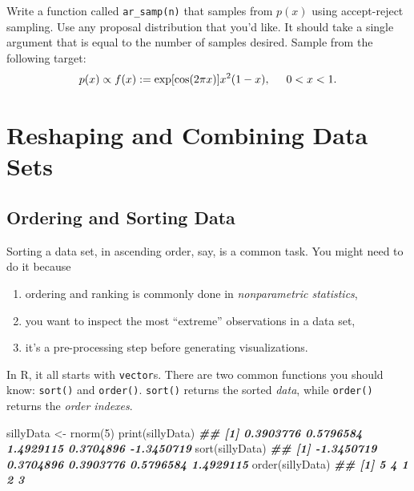 \documentclass[
  12pt,
  krantz2]{krantz}
\makeatletter
\newenvironment{Shaded}{\begin{snugshade}}{\end{snugshade}}
\newcommand{\DecValTok}[1]{\textcolor[rgb]{0.06,0.06,0.06}{#1}}
\newcommand{\DocumentationTok}[1]{\textcolor[rgb]{0.37,0.37,0.37}{\textbf{\textit{#1}}}}
\newcommand{\FunctionTok}[1]{\textcolor[rgb]{0,0,0}{#1}}
\newcommand{\NormalTok}[1]{#1}
\newcommand{\OtherTok}[1]{\textcolor[rgb]{0.37,0.37,0.37}{#1}}
\providecommand{\tightlist}{%
  \setlength{\itemsep}{0pt}\setlength{\parskip}{0pt}}
\newenvironment{kframe}{%
\medskip{}
\setlength{\fboxsep}{.8em}
 \def\at@end@of@kframe{}%
 \ifinner\ifhmode%
  \def\at@end@of@kframe{\end{minipage}}%
  \begin{minipage}{\columnwidth}%
 \fi\fi%
 \def\FrameCommand##1{\hskip\@totalleftmargin \hskip-\fboxsep
 \colorbox{shadecolor}{##1}\hskip-\fboxsep
     \hskip-\linewidth \hskip-\@totalleftmargin \hskip\columnwidth}%
 \MakeFramed {\advance\hsize-\width
   \@totalleftmargin\z@ \linewidth\hsize
   \@setminipage}}%
 {\par\unskip\endMakeFramed%
 \at@end@of@kframe}
\renewenvironment{Shaded}{\begin{kframe}}{\end{kframe}}
\makeatother
\begin{document}
Write a function called \texttt{ar\_samp(n)} that samples from \(p(x)\) using accept-reject sampling. Use any proposal distribution that you'd like. It should take a single argument that is equal to the number of samples desired. Sample from the following target:
\begin{equation} 
p(x) \propto f(x) := \exp[\cos(2\pi x)] x^2(1-x), \hspace{5mm} 0 < x < 1.
\end{equation}

\hypertarget{reshaping-and-combining-data-sets}{%
\chapter{Reshaping and Combining Data Sets}\label{reshaping-and-combining-data-sets}}

\hypertarget{ordering-and-sorting-data}{%
\section{Ordering and Sorting Data}\label{ordering-and-sorting-data}}

Sorting a data set, in ascending order, say, is a common task. You might need to do it because

\begin{enumerate}
\def\labelenumi{\arabic{enumi}.}
\tightlist
\item
  ordering and ranking is commonly done in \emph{nonparametric statistics},
\item
  you want to inspect the most ``extreme'' observations in a data set,
\item
  it's a pre-processing step before generating visualizations.
\end{enumerate}

In R, it all starts with \texttt{vector}s. There are two common functions you should know: \texttt{sort()} and \texttt{order()}. \texttt{sort()} returns the sorted \emph{data}, while \texttt{order()} returns the \emph{order indexes}.

\begin{Shaded}
\begin{Highlighting}[]
\NormalTok{sillyData }\OtherTok{\textless{}{-}} \FunctionTok{rnorm}\NormalTok{(}\DecValTok{5}\NormalTok{)}
\FunctionTok{print}\NormalTok{(sillyData)}
\DocumentationTok{\#\# [1]  0.3903776  0.5796584  1.4929115  0.3704896 {-}1.3450719}
\FunctionTok{sort}\NormalTok{(sillyData)}
\DocumentationTok{\#\# [1] {-}1.3450719  0.3704896  0.3903776  0.5796584  1.4929115}
\FunctionTok{order}\NormalTok{(sillyData)}
\DocumentationTok{\#\# [1] 5 4 1 2 3}
\end{Highlighting}
\end{Shaded}
\end{document}
